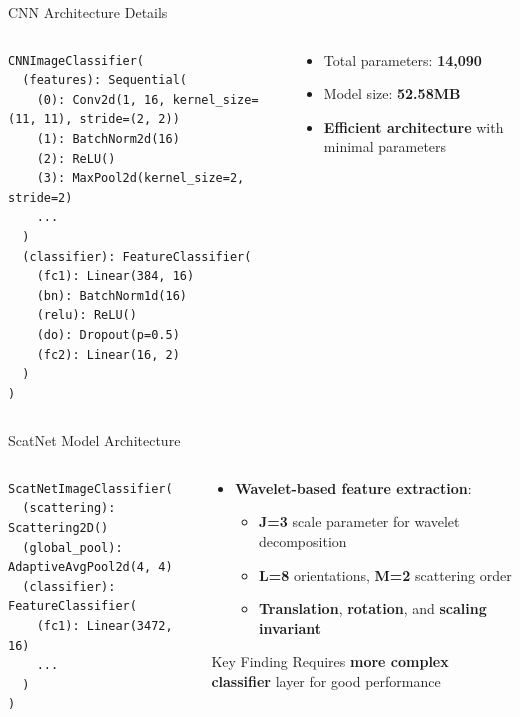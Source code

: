 \documentclass[aspectratio=169,8pt]{beamer}  %
\begin{document}
\begin{frame}[fragile]{CNN Architecture Details}
\begin{columns}[T]
\begin{column}{0.6\textwidth}
\begin{verbatim}
CNNImageClassifier(
  (features): Sequential(
    (0): Conv2d(1, 16, kernel_size=(11, 11), stride=(2, 2))
    (1): BatchNorm2d(16)
    (2): ReLU()
    (3): MaxPool2d(kernel_size=2, stride=2)
    ...
  )
  (classifier): FeatureClassifier(
    (fc1): Linear(384, 16)
    (bn): BatchNorm1d(16)
    (relu): ReLU()
    (do): Dropout(p=0.5)
    (fc2): Linear(16, 2)
  )
)
\end{verbatim}
\end{column}
\begin{column}{0.4\textwidth}
\begin{itemize}
\item Total parameters: \textbf{14,090}
\item Model size: \textbf{52.58MB}
\item \textbf{Efficient architecture} with minimal parameters
\end{itemize}
\end{column}
\end{columns}
\end{frame}

\begin{frame}[fragile]{ScatNet Model Architecture}
\begin{columns}[T]
\begin{column}{0.6\textwidth}
\begin{verbatim}
ScatNetImageClassifier(
  (scattering): Scattering2D()
  (global_pool): AdaptiveAvgPool2d(4, 4)
  (classifier): FeatureClassifier(
    (fc1): Linear(3472, 16)
    ...
  )
)
\end{verbatim}
\end{column}
\begin{column}{0.4\textwidth}
\begin{itemize}
\item \textbf{Wavelet-based feature extraction}:
  \begin{itemize}
  \item \textbf{J=3} scale parameter for wavelet decomposition
  \item \textbf{L=8} orientations, \textbf{M=2} scattering order
  \item \textbf{Translation}, \textbf{rotation}, and \textbf{scaling invariant}
  \end{itemize}
\end{itemize}

\begin{block}{Key Finding}
Requires \textbf{more complex classifier} layer for good performance
\end{block}
\end{column}
\end{columns}
\end{frame}
\end{document}
